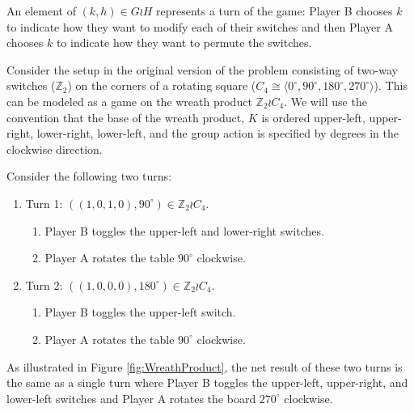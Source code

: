An element of $(k, h) \in G \wr H$ represents a turn of the game:
Player B chooses $k$ to indicate how they want to modify each of their switches
and then Player A chooses $k$ to indicate how they want to permute the switches.

\begin{example}
  Consider the setup in the original version of the problem consisting of
  two-way switches ($\mathbb Z_2$)
  on the corners of a rotating square
  ($C_4 \cong \langle 0^\circ, 90^\circ, 180^\circ, 270^\circ \rangle$).
  This can be modeled as a game on the wreath product $\mathbb Z_2 \wr C_4$.
  We will use the convention that the base of the wreath product, $K$ is
  ordered upper-left, upper-right, lower-right, lower-left, and the group
  action is specified by degrees in the clockwise direction.

  Consider the following two turns:
  \begin{enumerate}
    \item Turn 1: $((1,0,1,0), 90^\circ) \in \mathbb Z_2 \wr C_4$.
    \begin{enumerate}
      \item Player B toggles the upper-left and lower-right switches.
      \item Player A rotates the table $90^\circ$ clockwise.
    \end{enumerate}
    \item Turn 2: $((1,0,0,0), 180^\circ) \in \mathbb Z_2 \wr C_4$.
    \begin{enumerate}
      \item Player B toggles the upper-left switch.
      \item Player A rotates the table $90^\circ$ clockwise.
    \end{enumerate}
  \end{enumerate}

  As illustrated in Figure \ref{fig:WreathProduct},
  the net result of these two turns is the same as
  a single turn where Player B toggles the upper-left, upper-right, and lower-left
  switches and Player A rotates the board $270^\circ$ clockwise.

  \begin{figure}
    \center
\end{figure}
\end{example}
